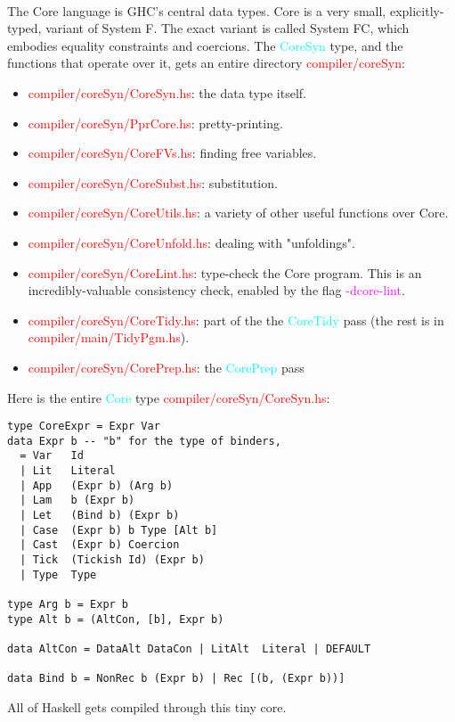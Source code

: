 \documentclass{article}
\begin{document}
	\paragraph{}
	The Core language is GHC's central data types. Core is a very small, explicitly-typed, variant of System F. The exact variant is called System FC, which embodies equality constraints and coercions.
	The \textcolor{cyan}{CoreSyn} type, and the functions that operate over it, gets an entire directory \textcolor{red}{compiler/coreSyn}:
	\begin{itemize}
		\item \textcolor{red}{compiler/coreSyn/CoreSyn.hs}: the data type itself.
		\item \textcolor{red}{compiler/coreSyn/PprCore.hs}: pretty-printing.
		\item \textcolor{red}{compiler/coreSyn/CoreFVs.hs}: finding free variables.
		\item \textcolor{red}{compiler/coreSyn/CoreSubst.hs}: substitution.
		\item \textcolor{red}{compiler/coreSyn/CoreUtils.hs}: a variety of other useful functions over Core.
		\item \textcolor{red}{compiler/coreSyn/CoreUnfold.hs}: dealing with "unfoldings".
		\item \textcolor{red}{compiler/coreSyn/CoreLint.hs}: type-check the Core program. This is an incredibly-valuable consistency check, enabled by the flag \textcolor{magenta}{-dcore-lint}.
		\item \textcolor{red}{compiler/coreSyn/CoreTidy.hs}: part of the the \textcolor{cyan}{CoreTidy} pass (the rest is in \textcolor{red}{compiler/main/TidyPgm.hs}).
		\item \textcolor{red}{compiler/coreSyn/CorePrep.hs}: the \textcolor{cyan}{CorePrep} pass
	\end{itemize}
	Here is the entire \textcolor{cyan}{Core} type \textcolor{red}{compiler/coreSyn/CoreSyn.hs}:
	\begin{lstlisting}
type CoreExpr = Expr Var
data Expr b	-- "b" for the type of binders, 
  = Var	  Id
  | Lit   Literal
  | App   (Expr b) (Arg b)
  | Lam   b (Expr b)
  | Let   (Bind b) (Expr b)
  | Case  (Expr b) b Type [Alt b]
  | Cast  (Expr b) Coercion
  | Tick  (Tickish Id) (Expr b)
  | Type  Type

type Arg b = Expr b
type Alt b = (AltCon, [b], Expr b)

data AltCon = DataAlt DataCon | LitAlt  Literal | DEFAULT

data Bind b = NonRec b (Expr b) | Rec [(b, (Expr b))]
	\end{lstlisting}
	All of Haskell gets compiled through this tiny core.
\end{document}
